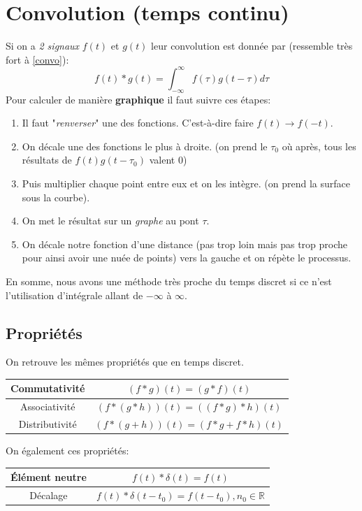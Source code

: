 \documentclass{report}
\begin{document}
\section{Convolution (temps continu)}
Si on a \textit{2 signaux} $f(t)$ et $g(t)$ leur convolution est donnée par (ressemble très fort à \ref{convo}):
\begin{equation}
f(t) \ast g(t) = \int_{-\infty}^{\infty}f(\tau)g(t-\tau)d\tau
\end{equation}
Pour calculer de manière \textbf{graphique} il faut suivre ces étapes:
\begin{enumerate}
\item Il faut "\textit{renverser}" une des fonctions. C'est-à-dire faire $f(t) \rightarrow f(-t)$.
\item On décale une des fonctions le plus à droite. (on prend le $\tau_0$ où après, tous les résultats de $f(t)g(t-\tau_0)$ valent $0$) 
\item Puis multiplier chaque point entre eux et on les intègre. (on prend la surface sous la courbe).
\item On met le résultat sur un \textit{graphe} au pont $\tau$.
\item On décale notre fonction d'une distance (pas trop loin mais pas trop proche pour ainsi avoir une nuée de points) vers la gauche et on répète le processus.
\end{enumerate}
En somme, nous avons une méthode très proche du temps discret si ce n'est l'utilisation d'intégrale allant de $-\infty$ à $\infty$.

\subsection{Propriétés}
On retrouve les mêmes propriétés que en temps discret.
\begin{center}
\begin{tabular}{c|c}
	Commutativité & $(f\ast g)(t) = (g \ast f)(t)$ \\
	\hline
	Associativité & $(f \ast (g \ast h))(t) = ((f \ast g) \ast h)(t)$ \\
	\hline
	Distributivité & $(f \ast (g + h))(t) = (f \ast g + f \ast h)(t)$ \\
\end{tabular}
\end{center}
On également ces propriétés:
\begin{center}
\begin{tabular}{c|c}
	Élément neutre & $f(t) \ast \delta(t) = f(t)$ \\
	\hline
	Décalage & $f(t) \ast \delta(t-t_0) = f(t-t_0), n_0 \in \mathbb{R}$ \\
\end{tabular}
\end{center}
\end{document}
